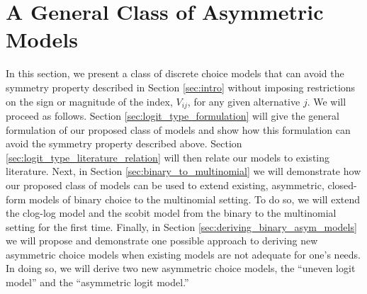 \section{A General Class of Asymmetric Models}
\label{sec:logit_type_models}
In this section, we present a class of discrete choice models that can avoid the symmetry property described in Section \ref{sec:intro} without imposing restrictions on the sign or magnitude of the index, $V_{ij}$, for any given alternative $j$. We will proceed as follows. Section \ref{sec:logit_type_formulation} will give the general formulation of our proposed class of models and show how this formulation can avoid the symmetry property described above. Section \ref{sec:logit_type_literature_relation} will then relate our models to existing literature. Next, in Section \ref{sec:binary_to_multinomial} we will demonstrate how our proposed class of models can be used to extend existing, asymmetric, closed-form models of binary choice to the multinomial setting. To do so, we will extend the clog-log model and the scobit model from the binary to the multinomial setting for the first time. Finally, in Section \ref{sec:deriving_binary_asym_models} we will propose and demonstrate one possible approach to deriving new asymmetric choice models when existing models are not adequate for one's needs. In doing so, we will derive two new asymmetric choice models, the ``uneven logit model'' and the ``asymmetric logit model.''


